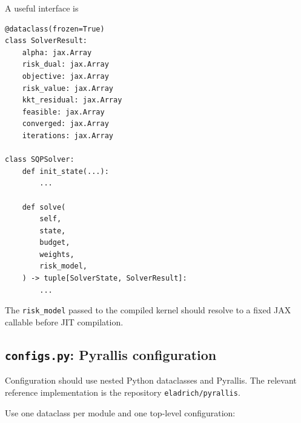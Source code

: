 \documentclass[11pt]{article}
\begin{document}
A useful interface is

\begin{verbatim}
@dataclass(frozen=True)
class SolverResult:
    alpha: jax.Array
    risk_dual: jax.Array
    objective: jax.Array
    risk_value: jax.Array
    kkt_residual: jax.Array
    feasible: jax.Array
    converged: jax.Array
    iterations: jax.Array

class SQPSolver:
    def init_state(...):
        ...

    def solve(
        self,
        state,
        budget,
        weights,
        risk_model,
    ) -> tuple[SolverState, SolverResult]:
        ...
\end{verbatim}

The \texttt{risk\_model} passed to the compiled kernel should resolve to a
fixed JAX callable before JIT compilation.

\subsection{\texttt{configs.py}: Pyrallis configuration}
\label{app:pyrallis-config}

Configuration should use nested Python dataclasses and Pyrallis.  The relevant
reference implementation is the repository
\texttt{eladrich/pyrallis}.

Use one dataclass per module and one top-level configuration:
\end{document}
